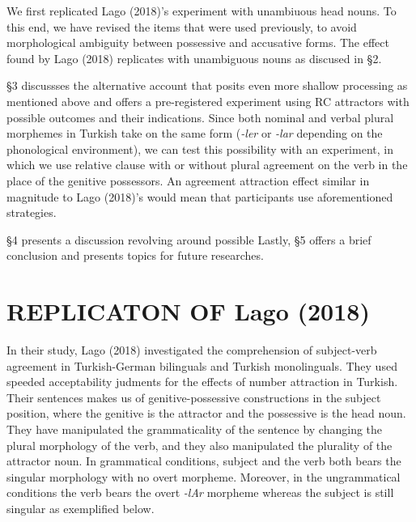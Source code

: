 \documentclass[11pt,a4paper]{article}
\begin{document}
We first replicated Lago (2018)'s experiment with unambiuous head nouns.
To this end, we have revised the items that were used previously, to
avoid morphological ambiguity between possessive and accusative forms.
The effect found by Lago (2018) replicates with unambiguous nouns as
discused in \S 2.

\S 3 discussses the alternative account that posits even more shallow
processing as mentioned above and offers a pre-registered experiment
using RC attractors with possible outcomes and their indications. Since
both nominal and verbal plural morphemes in Turkish take on the same
form (\emph{-ler} or \emph{-lar} depending on the phonological
environment), we can test this possibility with an experiment, in which
we use relative clause with or without plural agreement on the verb in
the place of the genitive possessors. An agreement attraction effect
similar in magnitude to Lago (2018)'s would mean that participants use
aforementioned strategies.

\S 4 presents a discussion revolving around possible Lastly, \S 5 offers
a brief conclusion and presents topics for future researches.

\hypertarget{replicaton-of-lago}{%
\section{REPLICATON OF Lago (2018)}\label{replicaton-of-lago}}

In their study, Lago (2018) investigated the comprehension of
subject-verb agreement in Turkish-German bilinguals and Turkish
monolinguals. They used speeded acceptability judments for the effects
of number attraction in Turkish. Their sentences makes us of
genitive-possessive constructions in the subject position, where the
genitive is the attractor and the possessive is the head noun. They have
manipulated the grammaticality of the sentence by changing the plural
morphology of the verb, and they also manipulated the plurality of the
attractor noun. In grammatical conditions, subject and the verb both
bears the singular morphology with no overt morpheme. Moreover, in the
ungrammatical conditions the verb bears the overt \emph{-lAr} morpheme
whereas the subject is still singular as exemplified below.
\end{document}
